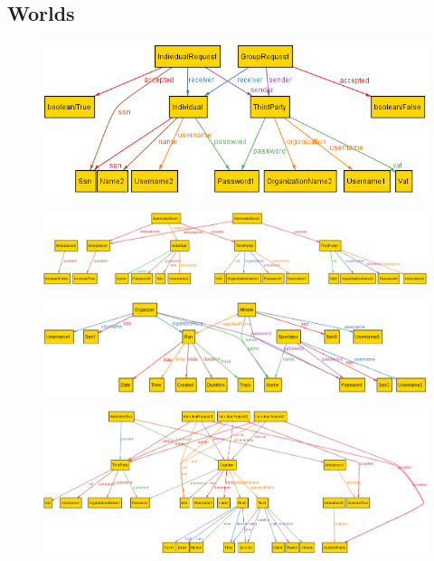 \documentclass[a4paper]{article}
\begin{document}
\subsection{Worlds}
    
    \begin{figure}[!ht]
    	\centering
    	\includegraphics[width=\textwidth]{RASD/images/alloy/data4Help.png}
    \end{figure}
    
    
    \begin{figure}[!ht]
    	\centering
    	\includegraphics[width=\textwidth]{RASD/images/alloy/automatedSOS.png}
    \end{figure}
    
    \begin{figure}[!ht]
    	\centering
    	\includegraphics[width=\textwidth]{RASD/images/alloy/track4Run.png}
    \end{figure}
    \newpage
    
    \begin{figure}[!ht]
    	\centering
    	\includegraphics[width=0.91\paperwidth, angle=90]{RASD/images/alloy/showAll.png}
    \end{figure}
    \newpage
\end{document}
